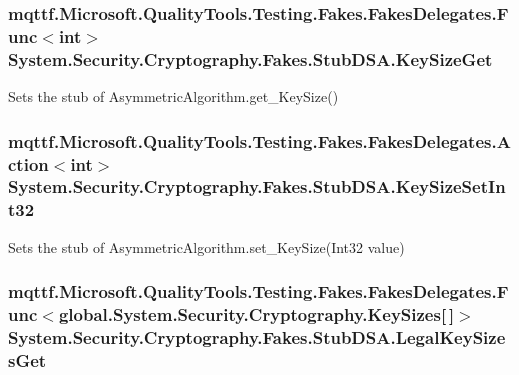 \hypertarget{class_system_1_1_security_1_1_cryptography_1_1_fakes_1_1_stub_d_s_a_a95ebf784fc6ff29aef6d62ad37cb04c9}{
\subsubsection[{Key\-Size\-Get}]{\setlength{\rightskip}{0pt plus 5cm}mqttf.\-Microsoft.\-Quality\-Tools.\-Testing.\-Fakes.\-Fakes\-Delegates.\-Func$<$int$>$ System.\-Security.\-Cryptography.\-Fakes.\-Stub\-D\-S\-A.\-Key\-Size\-Get}}\label{class_system_1_1_security_1_1_cryptography_1_1_fakes_1_1_stub_d_s_a_a95ebf784fc6ff29aef6d62ad37cb04c9}


Sets the stub of Asymmetric\-Algorithm.\-get\-\_\-\-Key\-Size()

\hypertarget{class_system_1_1_security_1_1_cryptography_1_1_fakes_1_1_stub_d_s_a_a0714fd85b4d3424723cb301133c0b37a}{
\subsubsection[{Key\-Size\-Set\-Int32}]{\setlength{\rightskip}{0pt plus 5cm}mqttf.\-Microsoft.\-Quality\-Tools.\-Testing.\-Fakes.\-Fakes\-Delegates.\-Action$<$int$>$ System.\-Security.\-Cryptography.\-Fakes.\-Stub\-D\-S\-A.\-Key\-Size\-Set\-Int32}}\label{class_system_1_1_security_1_1_cryptography_1_1_fakes_1_1_stub_d_s_a_a0714fd85b4d3424723cb301133c0b37a}


Sets the stub of Asymmetric\-Algorithm.\-set\-\_\-\-Key\-Size(\-Int32 value)

\hypertarget{class_system_1_1_security_1_1_cryptography_1_1_fakes_1_1_stub_d_s_a_af1f9f0c7e53d84c28821cc8045e3b023}{
\subsubsection[{Legal\-Key\-Sizes\-Get}]{\setlength{\rightskip}{0pt plus 5cm}mqttf.\-Microsoft.\-Quality\-Tools.\-Testing.\-Fakes.\-Fakes\-Delegates.\-Func$<$global.\-System.\-Security.\-Cryptography.\-Key\-Sizes\mbox{[}$\,$\mbox{]}$>$ System.\-Security.\-Cryptography.\-Fakes.\-Stub\-D\-S\-A.\-Legal\-Key\-Sizes\-Get}}\label{class_system_1_1_security_1_1_cryptography_1_1_fakes_1_1_stub_d_s_a_af1f9f0c7e53d84c28821cc8045e3b023}


